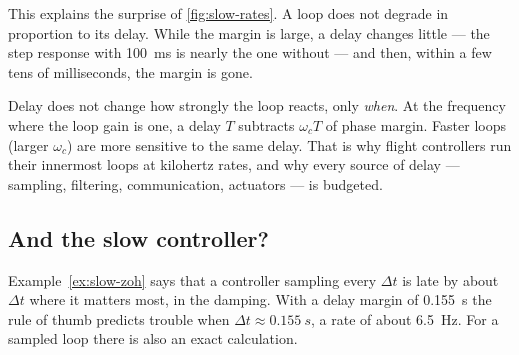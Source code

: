 This explains the surprise of \cref{fig:slow-rates}. A loop does not degrade in proportion to its delay. While the margin is large, a delay changes little — the step response with \SI{100}{ms} is nearly the one without — and then, within a few tens of milliseconds, the margin is gone.

\begin{keyidea}
Delay does not change how strongly the loop reacts, only \emph{when}. At the frequency where the loop gain is one, a delay $T$ subtracts $\omega_c T$ of phase margin. Faster loops (larger $\omega_c$) are more sensitive to the same delay. That is why flight controllers run their innermost loops at kilohertz rates, and why every source of delay — sampling, filtering, communication, actuators — is budgeted.
\end{keyidea}

\subsection{And the slow controller?}
Example~\ref{ex:slow-zoh} says that a controller sampling every $\Delta t$ is late by about $\Delta t$ where it matters most, in the damping. With a delay margin of \SI{0.155}{s} the rule of thumb predicts trouble when $\Delta t \approx \SI{0.155}{s}$, a rate of about \SI{6.5}{Hz}. For a sampled loop there is also an exact calculation.

